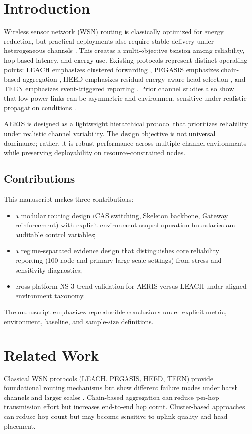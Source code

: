 ﻿\documentclass[sensors,article,submit,moreauthors,pdftex]{Definitions/mdpi}
\begin{document}
\section{Introduction}
Wireless sensor network (WSN) routing is classically optimized for energy reduction, but practical deployments also require stable delivery under heterogeneous channels \cite{Akyildiz2002Survey,Rault2016Energy,Kandris2020}. This creates a multi-objective tension among reliability, hop-based latency, and energy use. Existing protocols represent distinct operating points: LEACH emphasizes clustered forwarding \cite{Heinzelman2000LEACH}, PEGASIS emphasizes chain-based aggregation \cite{Lindsey2002PEGASIS}, HEED emphasizes residual-energy-aware head selection \cite{Younis2004HEED}, and TEEN emphasizes event-triggered reporting \cite{Manjeshwar2001TEEN}. Prior channel studies also show that low-power links can be asymmetric and environment-sensitive under realistic propagation conditions \cite{Zuniga2004,Zuniga2007Asymmetry,Baccour2012RLQE}.

AERIS is designed as a lightweight hierarchical protocol that prioritizes reliability under realistic channel variability. The design objective is not universal dominance; rather, it is robust performance across multiple channel environments while preserving deployability on resource-constrained nodes.

\subsection{Contributions}
This manuscript makes three contributions:
\begin{itemize}
\item a modular routing design (CAS switching, Skeleton backbone, Gateway reinforcement) with explicit environment-scoped operation boundaries and auditable control variables;
\item a regime-separated evidence design that distinguishes core reliability reporting (100-node and primary large-scale settings) from stress and sensitivity diagnostics;
\item cross-platform NS-3 trend validation for AERIS versus LEACH under aligned environment taxonomy.
\end{itemize}
The manuscript emphasizes reproducible conclusions under explicit metric, environment, baseline, and sample-size definitions.

\section{Related Work}
Classical WSN protocols (LEACH, PEGASIS, HEED, TEEN) provide foundational routing mechanisms but show different failure modes under harsh channels and larger scales \cite{Heinzelman2002LEACH,Lindsey2002PEGASIS,Younis2004HEED,Kandris2020}. Chain-based aggregation can reduce per-hop transmission effort but increases end-to-end hop count. Cluster-based approaches can reduce hop count but may become sensitive to uplink quality and head placement.
\end{document}
